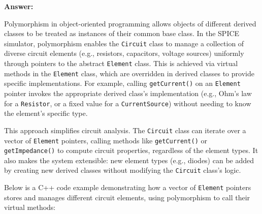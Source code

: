 \documentclass{article}
\begin{document}
\textbf{Answer:}

Polymorphism in object-oriented programming allows objects of different derived classes to be treated as instances of their common base class. In the SPICE simulator, polymorphism enables the \texttt{Circuit} class to manage a collection of diverse circuit elements (e.g., resistors, capacitors, voltage sources) uniformly through pointers to the abstract \texttt{Element} class. This is achieved via virtual methods in the \texttt{Element} class, which are overridden in derived classes to provide specific implementations. For example, calling \texttt{getCurrent()} on an \texttt{Element} pointer invokes the appropriate derived class’s implementation (e.g., Ohm’s law for a \texttt{Resistor}, or a fixed value for a \texttt{CurrentSource}) without needing to know the element’s specific type.

This approach simplifies circuit analysis. The \texttt{Circuit} class can iterate over a vector of \texttt{Element} pointers, calling methods like \texttt{getCurrent()} or \texttt{getImpedance()} to compute circuit properties, regardless of the element types. It also makes the system extensible: new element types (e.g., diodes) can be added by creating new derived classes without modifying the \texttt{Circuit} class’s logic.

Below is a C++ code example demonstrating how a vector of \texttt{Element} pointers stores and manages different circuit elements, using polymorphism to call their virtual methods:
\end{document}
